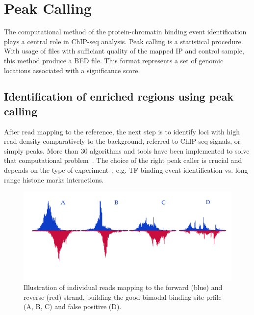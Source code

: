 \chapter{Peak Calling}

The computational method of the protein-chromatin binding event identification plays a central role in ChIP-seq analysis. 
Peak calling is a statistical procedure.
With usage of files with sufficiant quality of the mapped IP and control sample, this method produce a BED file.
This format represents a set of genomic locations associated with a significance score.

\section{Identification of enriched regions using peak calling}



 
After read mapping to the reference, the next step is to identify loci with high read density comparatively to the background, referred to ChIP-seq signals, or simply peaks.
More than 30 algorithms and tools have been implemented to solve that computational problem~\cite{chen2012systematic}.
The choice of the right peak caller is crucial and depends on the type of experiment~\cite{nakato2017recent}, e.g. TF binding event identification vs. long-range histone marks interactions.

\begin{figure}[b!]
    \centering
    \includegraphics[width=\textwidth]{../img/peaks_final.pdf}
    \caption{Illustration of individual reads mapping to the forward (blue) and reverse (red) strand, building the good bimodal binding site prfile (A, B, C) and false positive (D). }
    \label{fig:graph_classes}
\end{figure}

